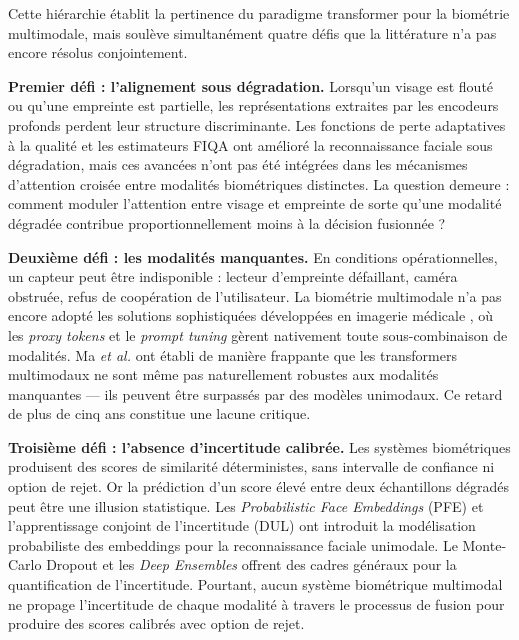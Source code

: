 \documentclass[12pt,a4paper]{report}
\begin{document}
Cette hi\'{e}rarchie \'{e}tablit la pertinence du paradigme transformer pour la biom\'{e}trie multimodale, mais soul\`{e}ve simultan\'{e}ment quatre d\'{e}fis que la litt\'{e}rature n'a pas encore r\'{e}solus conjointement.

\textbf{Premier d\'{e}fi : l'alignement sous d\'{e}gradation.} Lorsqu'un visage est flout\'{e} ou qu'une empreinte est partielle, les repr\'{e}sentations extraites par les encodeurs profonds perdent leur structure discriminante. Les fonctions de perte adaptatives \`{a} la qualit\'{e} \cite{kim2022adaface, meng2021magface} et les estimateurs FIQA \cite{boutros2023crfiqa} ont am\'{e}lior\'{e} la reconnaissance faciale sous d\'{e}gradation, mais ces avanc\'{e}es n'ont pas \'{e}t\'{e} int\'{e}gr\'{e}es dans les m\'{e}canismes d'attention crois\'{e}e entre modalit\'{e}s biom\'{e}triques distinctes. La question demeure : comment moduler l'attention entre visage et empreinte de sorte qu'une modalit\'{e} d\'{e}grad\'{e}e contribue proportionnellement moins \`{a} la d\'{e}cision fusionn\'{e}e ?

\textbf{Deuxi\`{e}me d\'{e}fi : les modalit\'{e}s manquantes.} En conditions op\'{e}rationnelles, un capteur peut \^{e}tre indisponible : lecteur d'empreinte d\'{e}faillant, cam\'{e}ra obstru\'{e}e, refus de coop\'{e}ration de l'utilisateur. La biom\'{e}trie multimodale n'a pas encore adopt\'{e} les solutions sophistiqu\'{e}es d\'{e}velopp\'{e}es en imagerie m\'{e}dicale \cite{ma2021smil, zhang2022mmformer, reza2025cmpt}, o\`{u} les \emph{proxy tokens} et le \emph{prompt tuning} g\`{e}rent nativement toute sous-combinaison de modalit\'{e}s. Ma \textit{et al.} \cite{ma2022multimodal} ont \'{e}tabli de mani\`{e}re frappante que les transformers multimodaux ne sont m\^{e}me pas naturellement robustes aux modalit\'{e}s manquantes --- ils peuvent \^{e}tre surpass\'{e}s par des mod\`{e}les unimodaux. Ce retard de plus de cinq ans constitue une lacune critique.

\textbf{Troisi\`{e}me d\'{e}fi : l'absence d'incertitude calibr\'{e}e.} Les syst\`{e}mes biom\'{e}triques produisent des scores de similarit\'{e} d\'{e}terministes, sans intervalle de confiance ni option de rejet. Or la pr\'{e}diction d'un score \'{e}lev\'{e} entre deux \'{e}chantillons d\'{e}grad\'{e}s peut \^{e}tre une illusion statistique. Les \emph{Probabilistic Face Embeddings} (PFE) \cite{shi2019pfe} et l'apprentissage conjoint de l'incertitude (DUL) \cite{chang2020data} ont introduit la mod\'{e}lisation probabiliste des embeddings pour la reconnaissance faciale unimodale. Le Monte-Carlo Dropout \cite{gal2016dropout} et les \emph{Deep Ensembles} \cite{fort2019deep} offrent des cadres g\'{e}n\'{e}raux pour la quantification de l'incertitude. Pourtant, aucun syst\`{e}me biom\'{e}trique multimodal ne propage l'incertitude de chaque modalit\'{e} \`{a} travers le processus de fusion pour produire des scores calibr\'{e}s avec option de rejet.
\end{document}
